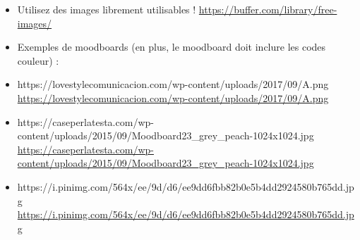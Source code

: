 \begin{itemize}
\item Utilisez des images librement utilisables ! \url{https://buffer.com/library/free-images/}
\item Exemples de moodboards (en plus, le moodboard doit inclure les codes couleur) :
\item https://lovestylecomunicacion.com/wp-content/uploads/2017/09/A.png \url{https://lovestylecomunicacion.com/wp-content/uploads/2017/09/A.png}
\item https://caseperlatesta.com/wp-content/uploads/2015/09/Moodboard23\_grey\_peach-1024x1024.jpg \url{https://caseperlatesta.com/wp-content/uploads/2015/09/Moodboard23_grey_peach-1024x1024.jpg}
\item https://i.pinimg.com/564x/ee/9d/d6/ee9dd6fbb82b0e5b4dd2924580b765dd.jpg \url{https://i.pinimg.com/564x/ee/9d/d6/ee9dd6fbb82b0e5b4dd2924580b765dd.jpg}
\end{itemize}


